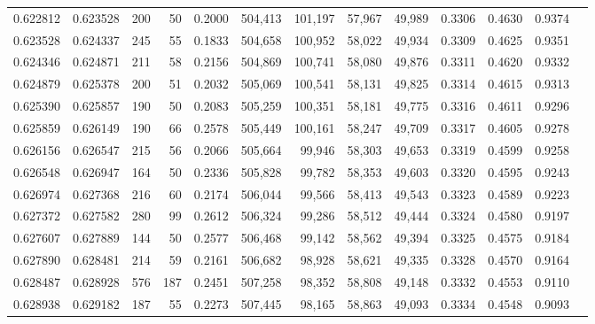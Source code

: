 \begin{tabular}{rrrrrrrrrrrrr}
0.622812 & 0.623528 &   200 &  50 &                                     0.2000 & 504,413 & 101,197 &  57,967 &  49,989 & 0.3306 & 0.4630 & 0.9374 \\
0.623528 & 0.624337 &   245 &  55 &                                     0.1833 & 504,658 & 100,952 &  58,022 &  49,934 & 0.3309 & 0.4625 & 0.9351 \\
0.624346 & 0.624871 &   211 &  58 &                                     0.2156 & 504,869 & 100,741 &  58,080 &  49,876 & 0.3311 & 0.4620 & 0.9332 \\
0.624879 & 0.625378 &   200 &  51 &                                     0.2032 & 505,069 & 100,541 &  58,131 &  49,825 & 0.3314 & 0.4615 & 0.9313 \\
0.625390 & 0.625857 &   190 &  50 &                                     0.2083 & 505,259 & 100,351 &  58,181 &  49,775 & 0.3316 & 0.4611 & 0.9296 \\
0.625859 & 0.626149 &   190 &  66 &                                     0.2578 & 505,449 & 100,161 &  58,247 &  49,709 & 0.3317 & 0.4605 & 0.9278 \\
0.626156 & 0.626547 &   215 &  56 &                                     0.2066 & 505,664 &  99,946 &  58,303 &  49,653 & 0.3319 & 0.4599 & 0.9258 \\
0.626548 & 0.626947 &   164 &  50 &                                     0.2336 & 505,828 &  99,782 &  58,353 &  49,603 & 0.3320 & 0.4595 & 0.9243 \\
0.626974 & 0.627368 &   216 &  60 &                                     0.2174 & 506,044 &  99,566 &  58,413 &  49,543 & 0.3323 & 0.4589 & 0.9223 \\
0.627372 & 0.627582 &   280 &  99 &                                     0.2612 & 506,324 &  99,286 &  58,512 &  49,444 & 0.3324 & 0.4580 & 0.9197 \\
0.627607 & 0.627889 &   144 &  50 &                                     0.2577 & 506,468 &  99,142 &  58,562 &  49,394 & 0.3325 & 0.4575 & 0.9184 \\
0.627890 & 0.628481 &   214 &  59 &                                     0.2161 & 506,682 &  98,928 &  58,621 &  49,335 & 0.3328 & 0.4570 & 0.9164 \\
0.628487 & 0.628928 &   576 & 187 &                                     0.2451 & 507,258 &  98,352 &  58,808 &  49,148 & 0.3332 & 0.4553 & 0.9110 \\
0.628938 & 0.629182 &   187 &  55 &                                     0.2273 & 507,445 &  98,165 &  58,863 &  49,093 & 0.3334 & 0.4548 & 0.9093 \\

\end{tabular}
